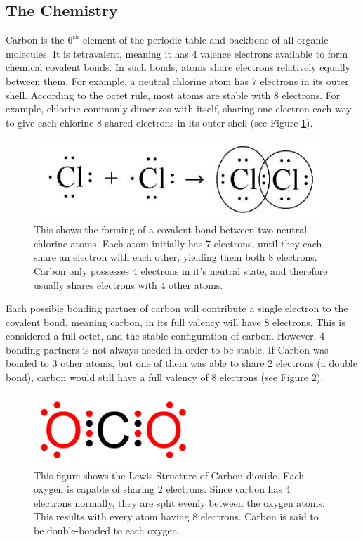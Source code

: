 \documentclass[12pt]{article}
\begin{document}
\subsection{The Chemistry}

Carbon is the $6^{th}$ element of the periodic table and backbone of all organic molecules. It is tetravalent, meaning it has 4 valence electrons available to form chemical covalent bonds. In such bonds, atoms share electrons relatively equally between them. For example, a neutral chlorine atom has 7 electrons in its outer shell. According to the octet rule, most atoms are stable with 8 electrons. For example, chlorine commonly dimerizes with itself, sharing one electron each way to give each chlorine 8 shared electrons in its outer shell (see Figure \ref{fig:chlorine}).

\begin{figure}[ht!]
\centering
\includegraphics[width=110mm]{chlorine.jpg}
\caption{This shows the forming of a covalent bond between two neutral chlorine atoms. Each atom initially has 7 electrons, until they each share an electron with each other, yielding them both 8 electrons. Carbon only possesses 4 electrons in it's neutral state, and therefore usually shares electrons with 4 other atoms.}
\label{fig:chlorine}
\end{figure}

Each possible bonding partner of carbon will contribute a single electron to the covalent bond, meaning carbon, in its full valency will have 8 electrons. This is considered a full octet, and the stable configuration of carbon. However, 4 bonding partners is not always needed in order to be stable. If Carbon was bonded to 3 other atoms, but one of them was able to share 2 electrons (a double bond), carbon would still have a full valency of 8 electrons (see Figure \ref{fig:C02}).

\begin{figure}[ht!]
\centering
\includegraphics[width=60mm]{c02.jpg}
\caption{This figure shows the Lewis Structure of Carbon dioxide. Each oxygen is capable of sharing 2 electrons. Since carbon has 4 electrons normally, they are split evenly between the oxygen atoms. This results with every atom having 8 electrons. Carbon is said to be double-bonded to each oxygen.}
\label{fig:C02}
\end{figure}
\end{document}
